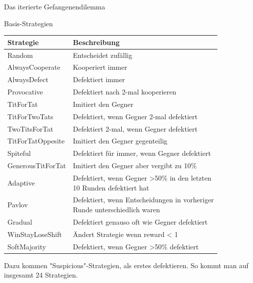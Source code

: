 \documentclass[final]{beamer}
\newlength{\colwidth}
\begin{document}
\begin{frame}[t]
\begin{columns}[t]
\begin{column}{\colwidth}
\begin{exampleblock}{Das iterierte Gefangenendilemma}

  \end{exampleblock}

  
  \begin{block}{Basis-Strategien}
    \begin{table}
      \centering
      \begin{tabular}{l l}
        \toprule
        \textbf{Strategie} & \textbf{Beschreibung} \\
        \midrule
        Random & Entscheidet zufällig \\
        \midrule
        AlwaysCooperate & Kooperiert immer \\
        \midrule
        AlwaysDefect & Defektiert immer \\
        \midrule
        Provocative & Defektiert nach 2-mal kooperieren \\
        \midrule
        TitForTat & Imitiert den Gegner \\
        \midrule
        TitForTwoTats & Defektiert, wenn Gegner 2-mal defektiert \\
        \midrule
        TwoTitsForTat & Defektiert 2-mal, wenn Gegner defektiert \\
        \midrule
        TitForTatOppesite & Imitiert den Gegner gegenteilig \\
        \midrule
        Spiteful & Defektiert für immer, wenn Gegner defektiert \\
        \midrule
        GenerousTitForTat & Imitiert den Gegner aber vergibt zu 10\% \\
        \midrule
        Adaptive & \makecell{Defektiert, wenn Gegner >50\% in den letzten \\ 10 Runden defektiert hat} \\
        \midrule
        Pavlov & \makecell{Defektiert, wenn Entscheidungen in vorheriger \\ Runde unterschiedlich waren} \\
        \midrule
        Gradual & Defektiert genauso oft wie Gegner defektiert \\
        \midrule
        WinStayLoseShift & Ändert Strategie wenn reward < 1 \\
        \midrule
        SoftMajority & Defektiert, wenn Gegner >50\% defektiert \\
        \bottomrule
      \end{tabular}
    \end{table}
    Dazu kommen "Suspicious"-Strategien, als erstes defektieren. So kommt man auf insgesamt 24 Strategien.
  

\end{block}
\end{column}
\end{columns}
\end{frame}
\end{document}
